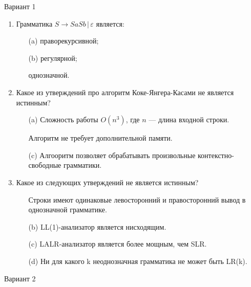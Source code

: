 \documentclass[12pt]{article}
\begin{document}
{\Large Вариант 1}
\medskip

\begin{enumerate}
  \item Грамматика $S \rightarrow S a S b \, | \, \varepsilon$ является:
  \begin{enumerate}
      \item[(a)] праворекурсивной;
      \item[(b)] регулярной;
      \item[\Checkmark] однозначной.
  \end{enumerate}
  
  \item Какое из утверждений про алгоритм Коке-Янгера-Касами не является истинным?
  \begin{enumerate}
      \item[(a)] Сложность работы $O(n^3)$, где $n$ --- длина входной строки.
      \item[\Checkmark] Алгоритм не требует дополнительной памяти.
      \item[(c)] Алгооритм позволяет обрабатывать произвольные контекстно-свободные грамматики.
  \end{enumerate}

  \item Какое из следующих утверждений не является истинным?
  \begin{enumerate}
      \item[\Checkmark] Строки имеют одинаковые левосторонний и правосторонний вывод в однозначной грамматике.
      \item[(b)] LL(1)-анализатор является нисходящим.
      \item[(c)] LALR-анализатор является более мощным, чем SLR.
      \item[(d)] Ни для какого k неоднозначная грамматика не может быть LR(k).
  \end{enumerate}
\end{enumerate}

\medskip

{\Large Вариант 2}
\medskip
\end{document}

